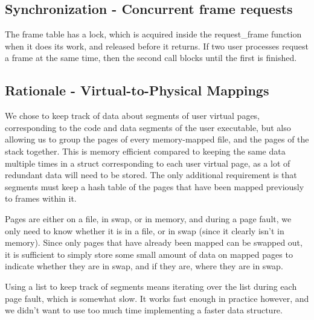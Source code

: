 \subsection{Synchronization - Concurrent frame requests}


The frame table has a lock, which is acquired inside the request\_frame
function when it does its work, and released before it returns. If two user
processes request a frame at the same time, then the second call blocks
until the first is finished.

\subsection{Rationale - Virtual-to-Physical Mappings}


We chose to keep track of data about segments of user virtual pages,
corresponding to the code and data segments of the user executable, but also
allowing us to group the pages of every memory-mapped file, and the pages of the
stack together. This is memory efficient compared to keeping the same data
multiple times in a struct corresponding to each user virtual page, as a lot of
redundant data will need to be stored. The only additional requirement is that
segments must keep a hash table of the pages that have been mapped previously to
frames within it.

Pages are either on a file, in swap, or in memory, and during a page fault, we
only need to know whether it is in a file, or in swap (since it clearly isn't in
memory). Since only pages that have already been mapped can be swapped out, it
is sufficient to simply store some small amount of data on mapped pages to
indicate whether they are in swap, and if they are, where they are in swap.

Using a list to keep track of segments means iterating over the list during each
page fault, which is somewhat slow. It works fast enough in practice however,
and we didn't want to use too much time implementing a faster data structure.
